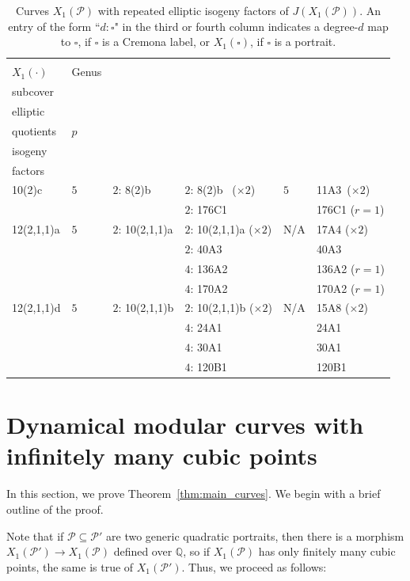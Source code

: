\documentclass[12pt]{amsart}
\theoremstyle{definition}
\newcommand{\bbQ}{\mathbb{Q}}
\newcommand{\calP}{\mathcal{P}}
\numberwithin{equation}{section}
\begin{document}
\begin{table}
\centering
\begin{tabular}{|l|l|l|l|l|l|}
 \hline
 \Shortunderstack{Curve \\ $X_1(\cdot)$} & 
 Genus &
 \Shortunderstack{Degree-$d$\\subcover} & \Shortunderstack{Degree-$d$\\elliptic\\quotients} & $p$ & \Shortunderstack{Elliptic\\ isogeny\\factors} \\
 \hline \hline
  10(2)c & $5$ & $2$: 8(2)b & $2$: 8(2)b \ ($\times 2$)& $5$ & 11A3\ ($\times 2$)\\
  & & & $2$: 176C1 & & 176C1 ($r=1$)\\
 \hline
 12(2,1,1)a & $5$ & $2$: 10(2,1,1)a & $2$: 10(2,1,1)a ($\times 2$) & N/A & 17A4 ($\times 2$)\\
  & & & $2$: 40A3 & & 40A3\\
  & & & $4$: 136A2 & & 136A2 ($r=1$)\\
  & & & $4$: 170A2 & & 170A2 ($r=1$)\\
 \hline
 12(2,1,1)d & $5$ & $2$: 10(2,1,1)b & $2$: 10(2,1,1)b ($\times 2$) & N/A & 15A8 ($\times 2$)\\
  & & & $4$: 24A1 & & 24A1\\
  & & & $4$: 30A1 & & 30A1\\
  & & & $4$: 120B1 & & 120B1\\
 \hline

\end{tabular}
\caption{Curves $X_1(\mathcal{P})$ with repeated elliptic isogeny factors of $J(X_1(\mathcal{P}))$. An entry of the form ``$d: \square$" in the third or fourth column indicates a degree-$d$ map to $\square$, if $\square$ is a Cremona label, or $X_1(\square)$, if $\square$ is a portrait.}
\label{table:repeated elliptic factors}
\end{table}

\section{Dynamical modular curves with infinitely many cubic points}\label{sec:infinitely_many}

In this section, we prove Theorem~\ref{thm:main_curves}. We begin with a brief outline of the proof.

Note that if $\calP \subseteq \calP'$ are two generic quadratic portraits, then there is a morphism $X_1(\calP') \to X_1(\calP)$ defined over $\bbQ$, so if $X_1(\calP)$ has only finitely many cubic points, the same is true of $X_1(\calP')$. Thus, we proceed as follows:
\end{document}
